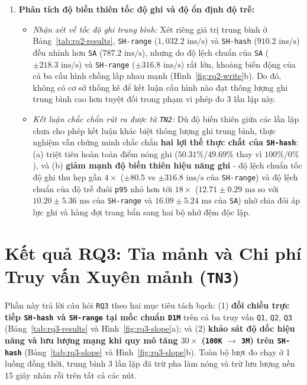 \begin{enumerate}[leftmargin=0.8cm, itemsep=4pt]
  \item \textbf{Phân tích độ biến thiên tốc độ ghi và độ ổn định độ trễ:}
  \begin{itemize}[leftmargin=0.6cm, itemsep=3pt]
    \item \textit{Nhận xét về tốc độ ghi trung bình:} Xét riêng giá trị trung bình ở Bảng~\ref{tab:rq2-results}, \texttt{SH-range} ($1{,}032.2\text{ ins/s}$) và \texttt{SH-hash} ($910.2\text{ ins/s}$) đều nhỉnh hơn \texttt{SA} ($787.2\text{ ins/s}$), nhưng do độ lệch chuẩn của \texttt{SA} ($\pm 218.3\text{ ins/s}$) và \texttt{SH-range} ($\pm 316.8\text{ ins/s}$) rất lớn, khoảng biến động của cả ba cấu hình chồng lấp nhau mạnh (Hình~\ref{fig:rq2-write}b). Do đó, không có cơ sở thống kê để kết luận cấu hình nào đạt thông lượng ghi trung bình cao hơn tuyệt đối trong phạm vi phép đo 3 lần lặp này.
    \item \textit{Kết luận chắc chắn rút ra được từ \texttt{TN2}:} Dù độ biến thiên giữa các lần lặp chưa cho phép kết luận khác biệt thông lượng ghi trung bình, thực nghiệm vẫn chứng minh chắc chắn \textbf{hai lợi thế thực chất của \texttt{SH-hash}}: (a) triệt tiêu hoàn toàn điểm nóng ghi ($50.31\%/49.69\%$ thay vì $100\%/0\%$), và (b) \textbf{giảm mạnh độ biến thiên hiệu năng ghi} - độ lệch chuẩn tốc độ ghi thu hẹp gần $4\times$ ($\pm 80.5$ vs $\pm 316.8\text{ ins/s}$ của \texttt{SH-range}) và độ lệch chuẩn của độ trễ đuôi \texttt{p95} nhỏ hơn tới \textbf{$18\times$} ($12.71 \pm 0.29\text{ ms}$ so với $10.20 \pm 5.36\text{ ms}$ của \texttt{SH-range} và $16.09 \pm 5.24\text{ ms}$ của \texttt{SA}) nhờ chia đôi áp lực ghi và hàng đợi trang bẩn sang hai bộ nhớ đệm độc lập.
  \end{itemize}
\end{enumerate}
\FloatBarrier

\section{Kết quả RQ3: Tỉa mảnh và Chi phí Truy vấn Xuyên mảnh (\texttt{TN3})}

Phần này trả lời câu hỏi \texttt{RQ3} theo hai mục tiêu tách bạch: (1) \textbf{đối chiếu trực tiếp \texttt{SH-hash} và \texttt{SH-range} tại mốc chuẩn \texttt{D1M}} trên cả ba truy vấn \texttt{Q1}, \texttt{Q2}, \texttt{Q3} (Bảng~\ref{tab:rq3-results} và Hình~\ref{fig:rq3-slope}a); và (2) \textbf{khảo sát độ dốc hiệu năng và lưu lượng mạng khi quy mô tăng $30\times$ (\texttt{100K} $\rightarrow$ \texttt{3M}) trên \texttt{SH-hash}} (Bảng~\ref{tab:rq3-slope} và Hình~\ref{fig:rq3-slope}b). Toàn bộ lượt đo chạy ở 1 luồng đồng thời, trung bình 3 lần lặp đã trừ pha làm nóng và trừ lưu lượng nền 15 giây nhàn rỗi trên tất cả các nút.

